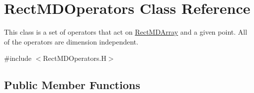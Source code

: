 \hypertarget{classRectMDOperators}{}\section{Rect\+M\+D\+Operators Class Reference}
\label{classRectMDOperators}


This class is a set of operators that act on \hyperlink{classRectMDArray}{Rect\+M\+D\+Array} and a given point. All of the operators are dimension independent.  




{\ttfamily \#include $<$Rect\+M\+D\+Operators.\+H$>$}

\subsection*{Public Member Functions}
